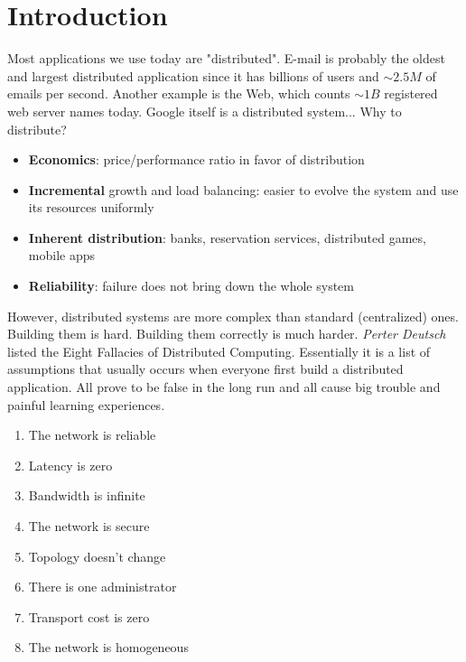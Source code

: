 \documentclass[10pt,a4paper]{article}
\begin{document}
\section{ \LARGE Introduction}
Most applications we use today are "distributed". E-mail is probably the oldest and largest distributed application since it has billions of users and $\sim{2.5M}$ of emails per second. Another example is the Web, which counts $\sim{1B}$ registered web server names today. Google itself is a distributed system...
Why to distribute?
\begin{itemize}
  \item \textbf{Economics}: price/performance ratio in favor of distribution
  \item \textbf{Incremental} growth and load balancing: easier to evolve the system and use its resources uniformly
  \item \textbf{Inherent distribution}: banks, reservation services, distributed games, mobile apps
  \item \textbf{Reliability}: failure does not bring down the whole system
\end{itemize}
However, distributed systems are more complex than standard (centralized) ones. Building them is hard. Building them correctly is much harder. 
\textit{Perter Deutsch} listed the Eight Fallacies of Distributed Computing. Essentially it is a list of assumptions that usually occurs when everyone first build a distributed application. All prove to be false in the long run and all cause big trouble and painful learning experiences.
\begin{enumerate}
  \item The network is reliable
  \item Latency is zero
  \item Bandwidth is infinite
  \item The network is secure
  \item Topology doesn't change
  \item There is one administrator
  \item  Transport cost is zero
  \item The network is homogeneous
\end{enumerate}
\end{document}
